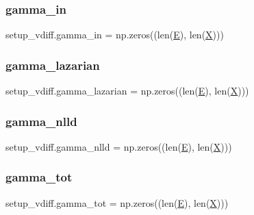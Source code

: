 \subsubsection{\texorpdfstring{gamma\+\_\+in}{gamma\_in}}
{\footnotesize\ttfamily setup\+\_\+vdiff.\+gamma\+\_\+in = np.\+zeros((len(\hyperlink{namespacesetup__vdiff_a7780682c76ff3896106f4045b64e582a}{E}), len(\hyperlink{namespacesetup__vdiff_a2d0381db5d912bb072d7cfa7c997de97}{X})))}

\mbox{\label{namespacesetup__vdiff_a41ce2a011346f04ee07aae2c33825dc3}} 
\subsubsection{\texorpdfstring{gamma\+\_\+lazarian}{gamma\_lazarian}}
{\footnotesize\ttfamily setup\+\_\+vdiff.\+gamma\+\_\+lazarian = np.\+zeros((len(\hyperlink{namespacesetup__vdiff_a7780682c76ff3896106f4045b64e582a}{E}), len(\hyperlink{namespacesetup__vdiff_a2d0381db5d912bb072d7cfa7c997de97}{X})))}

\mbox{\label{namespacesetup__vdiff_abc643cc371c5d15683fba13bac645ac9}} 
\subsubsection{\texorpdfstring{gamma\+\_\+nlld}{gamma\_nlld}}
{\footnotesize\ttfamily setup\+\_\+vdiff.\+gamma\+\_\+nlld = np.\+zeros((len(\hyperlink{namespacesetup__vdiff_a7780682c76ff3896106f4045b64e582a}{E}), len(\hyperlink{namespacesetup__vdiff_a2d0381db5d912bb072d7cfa7c997de97}{X})))}

\mbox{\label{namespacesetup__vdiff_a6979eb4486494f914d0010f2512864ac}} 
\subsubsection{\texorpdfstring{gamma\+\_\+tot}{gamma\_tot}}
{\footnotesize\ttfamily setup\+\_\+vdiff.\+gamma\+\_\+tot = np.\+zeros((len(\hyperlink{namespacesetup__vdiff_a7780682c76ff3896106f4045b64e582a}{E}), len(\hyperlink{namespacesetup__vdiff_a2d0381db5d912bb072d7cfa7c997de97}{X})))}

